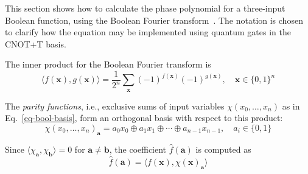 \documentclass[a4paper]{article}
\begin{document}
\vspace{0.3cm}

This section shows how to calculate the phase polynomial for a three-input Boolean function, using the Boolean Fourier transform~\cite{bib-odonnell}. The notation is chosen to clarify how the equation may be implemented using quantum gates in the CNOT+T basis. 

\vspace{0.3cm}

The inner product for the Boolean Fourier transform is
\begin{equation}
  \label{eq-inner-prod}
  \langle f(\mathbf{x}) , g(\mathbf{x}) \rangle = \frac{1}{2^n} \sum_{\mathbf{x}} (-1)^{f(\mathbf{x})} (-1)^{g(\mathbf{x})}, \quad \mathbf{x} \in \{0,1\}^n
\end{equation}

The {\it parity functions}, i.e., exclusive sums of input variables $\chi(x_0,\ldots,x_n)$ as in Eq.~\ref{eq-bool-basis}, form an orthogonal basis with respect to this product:
\begin{equation}
  \label{eq-bool-basis}
  \chi(x_0,\ldots,x_n)_{\mathbf{a}} = a_0 x_0 \oplus a_1 x_1 \oplus \cdots \oplus a_{n-1} x_{n-1},\quad a_i \in \{0,1\}
\end{equation}

\vspace{0.2cm}

Since $\langle \chi_{\mathbf{a}}, \chi_{\mathbf{b}} \rangle = 0$ for $\mathbf{a} \neq \mathbf{b}$, the coefficient $\hat{f}(\mathbf{a})$ is computed as
\begin{equation}
  \label{eq-fhat-prod}
  \hat{f}(\mathbf{a}) = \langle f(\mathbf{x}), \chi(\mathbf{x})_{\mathbf{a}} \rangle
\end{equation}

\vspace{0.2cm}
\end{document}
